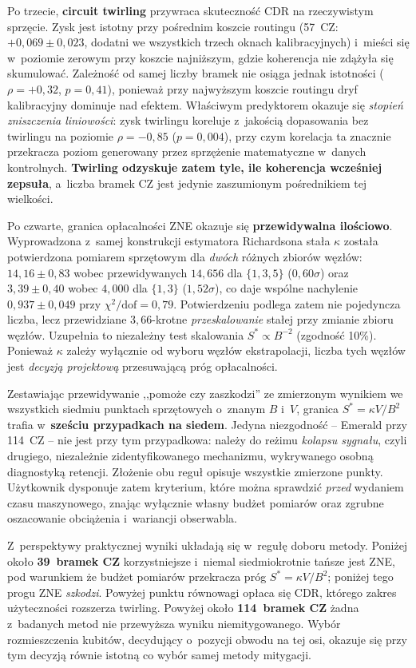 \documentclass[11pt]{article}
\begin{document}
Po trzecie, \textbf{circuit twirling} przywraca skuteczność CDR na rzeczywistym sprzęcie. Zysk jest
istotny przy pośrednim koszcie routingu (57~CZ: $+0{,}069 \pm 0{,}023$, dodatni we wszystkich trzech
oknach kalibracyjnych) i~mieści się w~poziomie zerowym przy koszcie najniższym, gdzie koherencja nie
zdążyła się skumulować. Zależność od samej liczby bramek nie osiąga jednak istotności
($\rho=+0{,}32$, $p=0{,}41$), ponieważ przy najwyższym koszcie routingu dryf kalibracyjny dominuje
nad efektem. Właściwym predyktorem okazuje się \emph{stopień zniszczenia liniowości}: zysk twirlingu
koreluje z~jakością dopasowania bez twirlingu na poziomie $\rho=-0{,}85$ ($p=0{,}004$), przy czym
korelacja ta znacznie przekracza poziom generowany przez sprzężenie matematyczne w~danych
kontrolnych. \textbf{Twirling odzyskuje zatem tyle, ile koherencja wcześniej zepsuła}, a~liczba
bramek CZ jest jedynie zaszumionym pośrednikiem tej wielkości.

Po czwarte, granica opłacalności ZNE okazuje się \textbf{przewidywalna ilościowo}. Wyprowadzona
z~samej konstrukcji estymatora Richardsona stała $\kappa$ została potwierdzona pomiarem sprzętowym
dla \emph{dwóch} różnych zbiorów węzłów: $14{,}16 \pm 0{,}83$ wobec przewidywanych $14{,}656$ dla
$\{1,3,5\}$ ($0{,}60\sigma$) oraz $3{,}39 \pm 0{,}40$ wobec $4{,}000$ dla $\{1,3\}$ ($1{,}52\sigma$),
co daje wspólne nachylenie $0{,}937 \pm 0{,}049$ przy $\chi^2/\mathrm{dof} = 0{,}79$. Potwierdzeniu
podlega zatem nie pojedyncza liczba, lecz przewidziane $3{,}66$-krotne \emph{przeskalowanie} stałej
przy zmianie zbioru węzłów. Uzupełnia to niezależny test skalowania $S^{*}\propto B^{-2}$ (zgodność
10\%). Ponieważ $\kappa$ zależy wyłącznie od wyboru węzłów ekstrapolacji, liczba tych węzłów jest
\emph{decyzją projektową} przesuwającą próg opłacalności.

Zestawiając przewidywanie ,,pomoże czy zaszkodzi'' ze zmierzonym wynikiem we wszystkich
siedmiu punktach sprzętowych o~znanym $B$ i~$V$, granica $S^{*}=\kappa V/B^2$ trafia
w~\textbf{sześciu przypadkach na siedem}. Jedyna niezgodność -- Emerald przy 114~CZ -- nie jest
przy tym przypadkowa: należy do reżimu \emph{kolapsu sygnału}, czyli drugiego, niezależnie
zidentyfikowanego mechanizmu, wykrywanego osobną diagnostyką retencji. Złożenie obu reguł opisuje
wszystkie zmierzone punkty. Użytkownik dysponuje zatem kryterium, które można sprawdzić
\emph{przed} wydaniem czasu maszynowego, znając wyłącznie własny budżet pomiarów oraz zgrubne
oszacowanie obciążenia i~wariancji obserwabla.

Z~perspektywy praktycznej wyniki układają się w~regułę doboru metody. Poniżej około
\textbf{39~bramek CZ} korzystniejsze i~niemal siedmiokrotnie tańsze jest ZNE, pod warunkiem
że budżet pomiarów przekracza próg $S^{*}=\kappa V/B^2$; poniżej tego progu ZNE \emph{szkodzi}.
Powyżej punktu równowagi opłaca się CDR, którego zakres użyteczności rozszerza twirling. Powyżej
około \textbf{114~bramek CZ} żadna z~badanych metod nie przewyższa wyniku niemitygowanego. Wybór
rozmieszczenia kubitów, decydujący o~pozycji obwodu na tej osi, okazuje się przy tym decyzją równie
istotną co wybór samej metody mitygacji.
\end{document}
